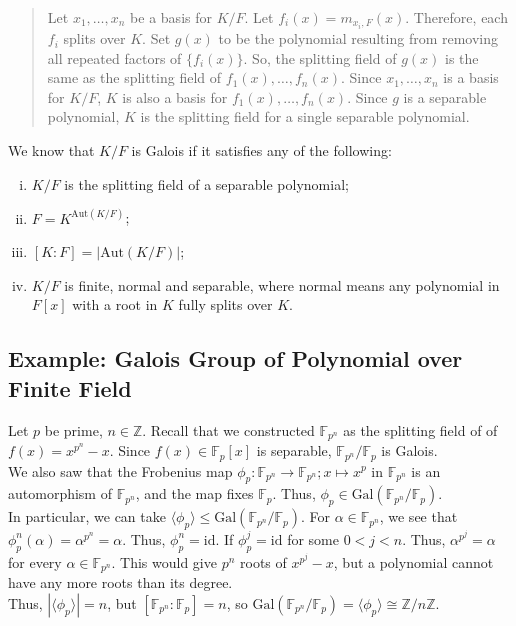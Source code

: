 \documentclass[10pt]{extarticle}
\newcommand{\Z}{\mathbb{Z}}
\begin{document}
\begin{quote}
    Let $x_1,\dots,x_n$ be a basis for $K/F$. Let $f_i(x) = m_{x_i,F}(x)$. Therefore, each $f_i$ splits over $K$. Set $g(x)$ to be the polynomial resulting from removing all repeated factors of $\{f_i(x)\}$. So, the splitting field of $g(x)$ is the same as the splitting field of $f_1(x),\dots,f_n(x)$. Since $x_1,\dots,x_n$ is a basis for $K/F$, $K$ is also a basis for $f_1(x),\dots,f_n(x)$. Since $g$ is a separable polynomial, $K$ is the splitting field for a single separable polynomial.
  \end{quote}
  We know that $K/F$ is Galois if it satisfies any of the following:
  \begin{enumerate}[(i)]
    \item $K/F$ is the splitting field of a separable polynomial;
    \item $F = K^{\text{Aut}(K/F)}$;
    \item $[K:F] = |\text{Aut}(K/F)|$;
    \item $K/F$ is finite, normal and separable, where normal means any polynomial in $F[x]$ with a root in $K$ fully splits over $K$.
  \end{enumerate}
  \subsection{Example: Galois Group of Polynomial over Finite Field}%
  Let $p$ be prime, $n\in \Z$. Recall that we constructed $\mathbb{F}_{p^n}$ as the splitting field of of $f(x) = x^{p^n} - x$. Since $f(x) \in \mathbb{F}_{p}[x]$ is separable, $\mathbb{F}_{p^n}/\mathbb{F}_p$ is Galois.\\

  We also saw that the Frobenius map $\phi_p: \mathbb{F}_{p^n}\rightarrow \mathbb{F}_{p^n};x\mapsto x^{p}$ in $\mathbb{F}_{p^n}$ is an automorphism of $\mathbb{F}_{p^n}$, and the map fixes $\mathbb{F}_p$. Thus, $\phi_p\in \text{Gal}(\mathbb{F}_{p^n}/\mathbb{F}_p)$.\\

  In particular, we can take $\langle \phi_p\rangle\leq \text{Gal}(\mathbb{F}_{p^n}/\mathbb{F}_p)$. For $\alpha \in \mathbb{F}_{p^n}$, we see that $\phi_p^{n}(\alpha) = \alpha^{p^n} = \alpha$. Thus, $\phi_p^{n} = \text{id}$. If $\phi_p^{j} = \text{id}$ for some $0 < j < n$. Thus, $\alpha^{p^j} = \alpha$ for every $\alpha\in \mathbb{F}_{p^n}$. This would give $p^n$ roots of $x^{p^j}-x$, but a polynomial cannot have any more roots than its degree.\\

  Thus, $|\langle \phi_p\rangle| = n$, but $[\mathbb{F}_{p^n}:\mathbb{F}_p] = n$, so $\text{Gal}(\mathbb{F}_{p^n}/\mathbb{F}_p) = \langle \phi_p\rangle \cong \Z/n\Z$.\\
\end{document}
